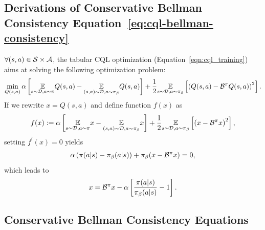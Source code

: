 \subsection{Derivations of Conservative Bellman Consistency Equation~\ref{eq:cql-bellman-consistency}}
$\forall (s,a)\in \mathcal S\times \mathcal A$, the tabular CQL optimization (Equation~\ref{eqn:cql_training}) aims at solving the following optimization problem:
\label{appendix:cql-critical-point}
\begin{equation}
    \begin{split}
        \min_{Q(s,a)} \alpha \left[  \underset{s\sim \mathcal D,a\sim \pi}{\mathbb E}Q(s,a)-\underset{(s,a)\sim \mathcal D,a\sim \pi_\beta}{\mathbb E}Q(s,a) \right]+\frac{1}{2}\underset{s\sim \mathcal D,a\sim \pi_\beta}{\mathbb E}\left[ \left( Q(s,a)-\mathcal B^\pi Q(s,a) \right)^2 \right].
    \end{split}
\end{equation}
If we rewrite $x = Q(s,a)$ and define function $f(x)$ as
\begin{equation}
    f(x) := \alpha \left[  \underset{s\sim \mathcal D,a\sim \pi}{\mathbb E}x-\underset{(s,a)\sim \mathcal D,a\sim \pi_\beta}{\mathbb E}x \right]+\frac{1}{2}\underset{s\sim \mathcal D,a\sim \pi_\beta}{\mathbb E}\left[ \left( x-\mathcal B^\pi x \right)^2 \right],
\end{equation}
setting $f^\prime(x) = 0$ yields
\begin{equation}
    \alpha \left( \pi(a|s) - \pi_\beta(a|s) \right) + \pi_\beta(x - \mathcal B^\pi x) = 0,
\end{equation}
which leads to 
\begin{equation}
    x = \mathcal B^\pi x - \alpha\left[ \frac{\pi(a|s)}{\pi_\beta(a|s)}-1 \right].
\end{equation}

\subsection{Conservative Bellman Consistency Equations}
